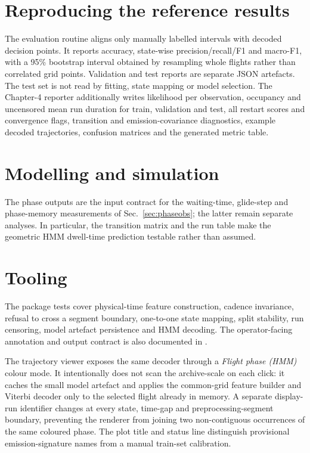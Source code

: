 \section{Reproducing the reference results}
\label{impl:reproducing}
The evaluation routine aligns only manually labelled intervals with decoded decision points.
It reports accuracy, state-wise precision/recall/F1 and macro-F1, with a 95\% bootstrap
interval obtained by resampling whole flights rather than correlated grid points. Validation
and test reports are separate JSON artefacts. The test set is not read by fitting, state
mapping or model selection. The Chapter-4 reporter additionally writes likelihood per
observation, occupancy and uncensored mean run duration for train, validation and test, all restart
scores and convergence flags, transition and emission-covariance diagnostics, example
decoded trajectories, confusion matrices and the generated metric table.

\section{Modelling and simulation}
\label{impl:modelling}
The phase outputs are the input contract for the waiting-time, glide-step and phase-memory
measurements of Sec.~\ref{sec:phaseobs}; the latter remain separate analyses. In particular,
the transition matrix and the run table make the geometric HMM dwell-time prediction
testable rather than assumed.

\section{Tooling}
\label{impl:tooling}
The package tests cover physical-time feature construction, cadence invariance, refusal to
cross a segment boundary, one-to-one state mapping, split stability, run censoring, model
artefact persistence and HMM decoding. The operator-facing annotation and output contract
is also documented in .

The trajectory viewer exposes the same decoder through a \emph{Flight phase (HMM)} colour
mode.  It intentionally does not scan the archive-scale  on
each click: it caches the small model artefact and applies the common-grid feature builder
and Viterbi decoder only to the selected flight already in memory.  A separate display-run
identifier changes at every state, time-gap and preprocessing-segment boundary, preventing
the renderer from joining two non-contiguous occurrences of the same coloured phase.  The
plot title and status line distinguish provisional emission-signature names from a manual train-set
calibration.

\stopcontents[impl]
